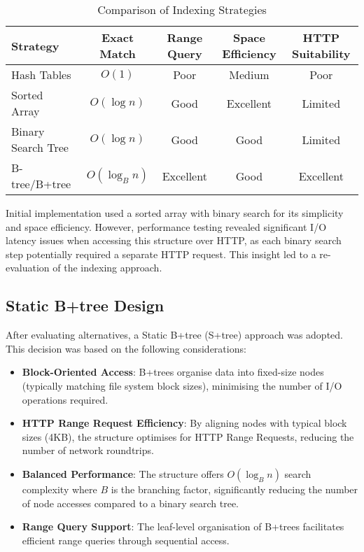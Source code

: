 \begin{table}[ht]
    \centering
    \caption{Comparison of Indexing Strategies}
    \begin{tabular}{l|c|c|c|c}
        \hline
        \textbf{Strategy} & \textbf{Exact Match} & \textbf{Range Query} & \textbf{Space Efficiency} & \textbf{HTTP Suitability} \\
        \hline
        Hash Tables & $O(1)$ & Poor & Medium & Poor \\
        Sorted Array & $O(\log n)$ & Good & Excellent & Limited \\
        Binary Search Tree & $O(\log n)$ & Good & Good & Limited \\
        B-tree/B+tree & $O(\log_B n)$ & Excellent & Good & Excellent \\
        \hline
    \end{tabular}
    \label{tab:indexing_strategies}
\end{table}

Initial implementation used a sorted array with binary search for its simplicity and space efficiency. However, performance testing revealed significant I/O latency issues when accessing this structure over HTTP, as each binary search step potentially required a separate HTTP request. This insight led to a re-evaluation of the indexing approach.

\subsection{Static B+tree Design}
\label{methodology:attribute_index:static_btree_design}

After evaluating alternatives, a Static B+tree (S+tree) approach was adopted. This decision was based on the following considerations:

\begin{itemize}
    \item \textbf{Block-Oriented Access}: B+trees organise data into fixed-size nodes (typically matching file system block sizes), minimising the number of I/O operations required.
    \item \textbf{HTTP Range Request Efficiency}: By aligning nodes with typical block sizes (4KB), the structure optimises for HTTP Range Requests, reducing the number of network roundtrips.
    \item \textbf{Balanced Performance}: The structure offers $O(\log_B n)$ search complexity where $B$ is the branching factor, significantly reducing the number of node accesses compared to a binary search tree.
    \item \textbf{Range Query Support}: The leaf-level organisation of B+trees facilitates efficient range queries through sequential access.
\end{itemize}


